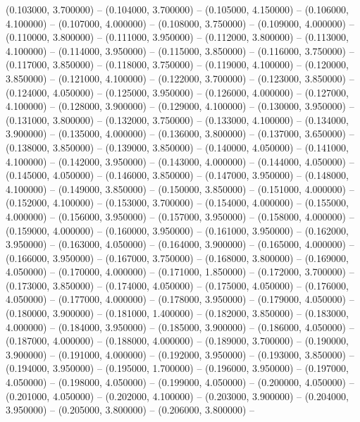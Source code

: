 (0.103000, 3.700000) -- 
(0.104000, 3.700000) -- 
(0.105000, 4.150000) -- 
(0.106000, 4.100000) -- 
(0.107000, 4.000000) -- 
(0.108000, 3.750000) -- 
(0.109000, 4.000000) -- 
(0.110000, 3.800000) -- 
(0.111000, 3.950000) -- 
(0.112000, 3.800000) -- 
(0.113000, 4.100000) -- 
(0.114000, 3.950000) -- 
(0.115000, 3.850000) -- 
(0.116000, 3.750000) -- 
(0.117000, 3.850000) -- 
(0.118000, 3.750000) -- 
(0.119000, 4.100000) -- 
(0.120000, 3.850000) -- 
(0.121000, 4.100000) -- 
(0.122000, 3.700000) -- 
(0.123000, 3.850000) -- 
(0.124000, 4.050000) -- 
(0.125000, 3.950000) -- 
(0.126000, 4.000000) -- 
(0.127000, 4.100000) -- 
(0.128000, 3.900000) -- 
(0.129000, 4.100000) -- 
(0.130000, 3.950000) -- 
(0.131000, 3.800000) -- 
(0.132000, 3.750000) -- 
(0.133000, 4.100000) -- 
(0.134000, 3.900000) -- 
(0.135000, 4.000000) -- 
(0.136000, 3.800000) -- 
(0.137000, 3.650000) -- 
(0.138000, 3.850000) -- 
(0.139000, 3.850000) -- 
(0.140000, 4.050000) -- 
(0.141000, 4.100000) -- 
(0.142000, 3.950000) -- 
(0.143000, 4.000000) -- 
(0.144000, 4.050000) -- 
(0.145000, 4.050000) -- 
(0.146000, 3.850000) -- 
(0.147000, 3.950000) -- 
(0.148000, 4.100000) -- 
(0.149000, 3.850000) -- 
(0.150000, 3.850000) -- 
(0.151000, 4.000000) -- 
(0.152000, 4.100000) -- 
(0.153000, 3.700000) -- 
(0.154000, 4.000000) -- 
(0.155000, 4.000000) -- 
(0.156000, 3.950000) -- 
(0.157000, 3.950000) -- 
(0.158000, 4.000000) -- 
(0.159000, 4.000000) -- 
(0.160000, 3.950000) -- 
(0.161000, 3.950000) -- 
(0.162000, 3.950000) -- 
(0.163000, 4.050000) -- 
(0.164000, 3.900000) -- 
(0.165000, 4.000000) -- 
(0.166000, 3.950000) -- 
(0.167000, 3.750000) -- 
(0.168000, 3.800000) -- 
(0.169000, 4.050000) -- 
(0.170000, 4.000000) -- 
(0.171000, 1.850000) -- 
(0.172000, 3.700000) -- 
(0.173000, 3.850000) -- 
(0.174000, 4.050000) -- 
(0.175000, 4.050000) -- 
(0.176000, 4.050000) -- 
(0.177000, 4.000000) -- 
(0.178000, 3.950000) -- 
(0.179000, 4.050000) -- 
(0.180000, 3.900000) -- 
(0.181000, 1.400000) -- 
(0.182000, 3.850000) -- 
(0.183000, 4.000000) -- 
(0.184000, 3.950000) -- 
(0.185000, 3.900000) -- 
(0.186000, 4.050000) -- 
(0.187000, 4.000000) -- 
(0.188000, 4.000000) -- 
(0.189000, 3.700000) -- 
(0.190000, 3.900000) -- 
(0.191000, 4.000000) -- 
(0.192000, 3.950000) -- 
(0.193000, 3.850000) -- 
(0.194000, 3.950000) -- 
(0.195000, 1.700000) -- 
(0.196000, 3.950000) -- 
(0.197000, 4.050000) -- 
(0.198000, 4.050000) -- 
(0.199000, 4.050000) -- 
(0.200000, 4.050000) -- 
(0.201000, 4.050000) -- 
(0.202000, 4.100000) -- 
(0.203000, 3.900000) -- 
(0.204000, 3.950000) -- 
(0.205000, 3.800000) -- 
(0.206000, 3.800000) -- 
